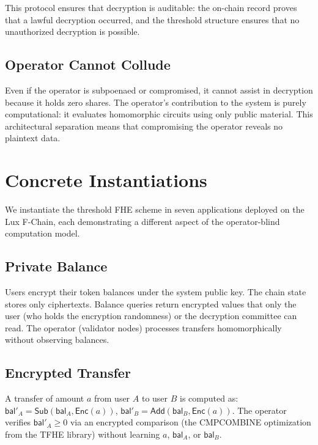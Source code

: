 \documentclass[11pt,a4paper]{article}
\begin{document}
This protocol ensures that decryption is auditable: the on-chain record
proves that a lawful decryption occurred, and the threshold structure
ensures that no unauthorized decryption is possible.

\subsection{Operator Cannot Collude}

Even if the operator is subpoenaed or compromised, it cannot assist in
decryption because it holds zero shares.  The operator's contribution
to the system is purely computational: it evaluates homomorphic circuits
using only public material.  This architectural separation means that
compromising the operator reveals no plaintext data.

\section{Concrete Instantiations}
\label{sec:demos}

We instantiate the threshold FHE scheme in seven applications deployed
on the Lux F-Chain, each demonstrating a different aspect of the
operator-blind computation model.

\subsection{Private Balance}

Users encrypt their token balances under the system public key.  The
chain state stores only ciphertexts.  Balance queries return encrypted
values that only the user (who holds the encryption randomness) or the
decryption committee can read.  The operator (validator nodes) processes
transfers homomorphically without observing balances.

\subsection{Encrypted Transfer}

A transfer of amount $a$ from user $A$ to user $B$ is computed as:
$\mathsf{bal}'_A = \mathsf{Sub}(\mathsf{bal}_A, \mathsf{Enc}(a))$,
$\mathsf{bal}'_B = \mathsf{Add}(\mathsf{bal}_B, \mathsf{Enc}(a))$.
The operator verifies $\mathsf{bal}'_A \geq 0$ via an encrypted
comparison (the CMPCOMBINE optimization from the TFHE library) without
learning $a$, $\mathsf{bal}_A$, or $\mathsf{bal}_B$.
\end{document}

